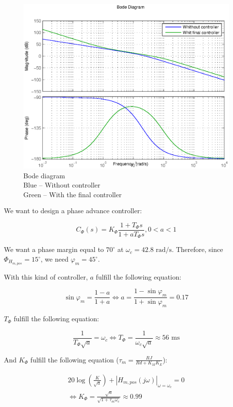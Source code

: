 \begin{center}
 \begin{figure}[ht]
 \includegraphics[width=\linewidth]{fig/bode_avance_phase.eps}
 \caption{Bode diagram \\ Blue -- Without controller \\ Green -- With the final controller}
 \label{bodePos2}
 \end{figure}
\end{center}


We want to design a phase advance controller:

$$C_{\Phi}(s) = K_{\Phi} \frac{1 + T_{\Phi}s}{1 + a T_{\Phi} s}, 0 < a < 1$$ 

We want a phase margin equal to $70^{\circ}$ at $\omega_c = 42.8 \text{ rad/s}$. Therefore, since $\Phi_{H_{m,pos}} = 15^{\circ}$, we need $\varphi_m = 45^{\circ}$.

With this kind of controller, $a$ fulfill the following equation:

$$\sin\varphi_m = \frac{1-a}{1+a} \Leftrightarrow a = \frac{1 - \sin\varphi_m}{1 + \sin\varphi_m} = 0.17$$

$T_{\Phi}$ fulfill the following equation:

$$\frac{1}{T_{\Phi}\sqrt{a}} = \omega_c \Leftrightarrow T_{\Phi} = \frac{1}{\omega_c \sqrt{a}} \approx 56 \text{ ms}$$

And $K_{\Phi}$ fulfill the following equation ($\tau_m = \frac{RJ}{Rd+K_M K_E}$): 

\begin{multline*} 20 \log\left(\frac{K}{\sqrt{a}}\right) + |H_{m,pos}(j\omega)|_{\omega = \omega_c} = 0 \\ \Leftrightarrow K_{\Phi} = \frac{\sqrt{a}}{\sqrt{1 + \tau_m \omega_c}} \approx 0.99 \end{multline*}


